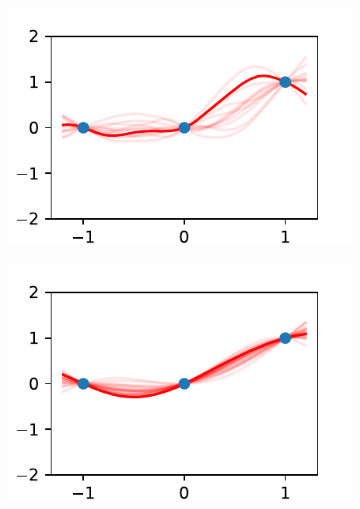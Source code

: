 \documentclass{beamer}
\begin{document}
\begin{frame}
\begin{figure}
\begin{subfigure}[t]{0.4\textwidth}
            \includegraphics[width=\textwidth]{flatish_GP_matern_25.0_tenths.pdf}
        \end{subfigure}%
        \begin{subfigure}[t]{0.4\textwidth}
            \centering
            \includegraphics[width=\textwidth]{flatish_GP_ell_10_tenths.pdf}
        \end{subfigure}%
    \end{figure}
\end{frame}

\end{document}
